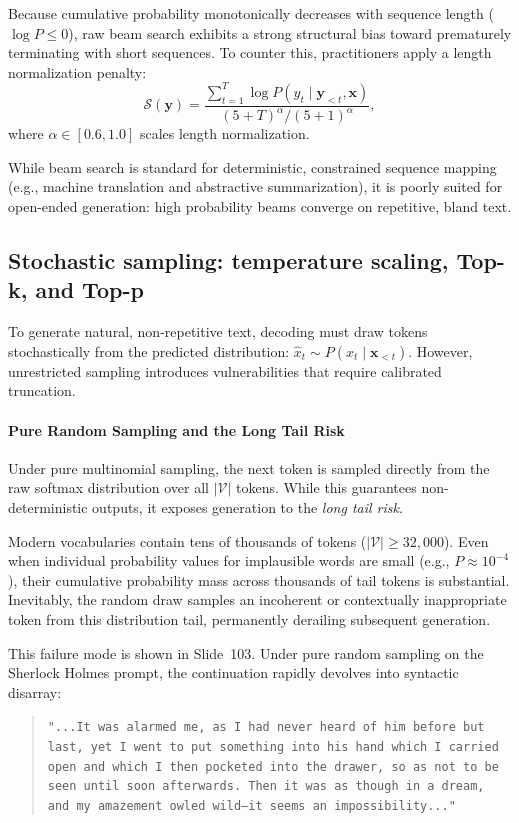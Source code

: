 \documentclass[../../main.tex]{subfiles}
\begin{document}
Because cumulative probability monotonically decreases with sequence length ($\log P \le 0$), raw beam search exhibits a strong structural bias toward prematurely terminating with short sequences. To counter this, practitioners apply a length normalization penalty:
\begin{equation}
\mathcal{S}(\mathbf{y}) = \frac{\sum_{t=1}^T \log P(y_t \mid \mathbf{y}_{<t}, \mathbf{x})}{(5 + T)^\alpha / (5 + 1)^\alpha},
\label{eq:beam_length_penalty}
\end{equation}
where $\alpha \in [0.6, 1.0]$ scales length normalization.

While beam search is standard for deterministic, constrained sequence mapping (e.g., machine translation and abstractive summarization), it is poorly suited for open-ended generation: high probability beams converge on repetitive, bland text.


\subsection{Stochastic sampling: temperature scaling, Top-k, and Top-p}
\label{subsec:stochastic_sampling}

To generate natural, non-repetitive text, decoding must draw tokens stochastically from the predicted distribution: $\hat{x}_t \sim P(x_t \mid \mathbf{x}_{<t})$. However, unrestricted sampling introduces vulnerabilities that require calibrated truncation.

\paragraph{Pure Random Sampling and the Long Tail Risk}
Under pure multinomial sampling, the next token is sampled directly from the raw softmax distribution over all $|\mathcal{V}|$ tokens. While this guarantees non-deterministic outputs, it exposes generation to the \emph{long tail risk}.

Modern vocabularies contain tens of thousands of tokens ($|\mathcal{V}| \ge 32,000$). Even when individual probability values for implausible words are small (e.g., $P \approx 10^{-4}$), their cumulative probability mass across thousands of tail tokens is substantial. Inevitably, the random draw samples an incoherent or contextually inappropriate token from this distribution tail, permanently derailing subsequent generation.

This failure mode is shown in Slide~103. Under pure random sampling on the Sherlock Holmes prompt, the continuation rapidly devolves into syntactic disarray:
\begin{quote}
\texttt{"...It was alarmed me, as I had never heard of him before but last, yet I went to put something into his hand which I carried open and which I then pocketed into the drawer, so as not to be seen until soon afterwards. Then it was as though in a dream, and my amazement owled wild--it seems an impossibility..."}
\end{quote}
\end{document}
